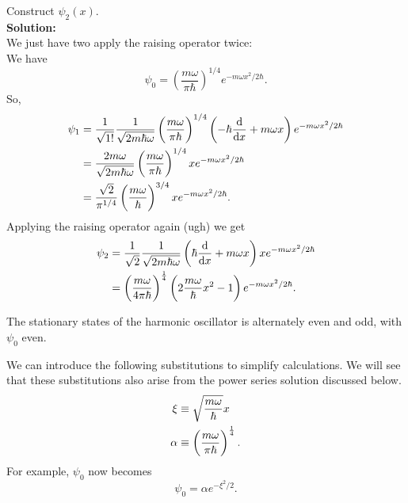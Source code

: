 \begin{wex}
Construct $\psi_2(x)$.\\
\textbf{Solution: }\\
We just have two apply the raising operator twice: \\
We have 
\begin{equation}
\psi_0=\left(\frac{m\omega}{\pi\hbar} \right)^{1/4}e^{-m\omega x^2/2\hbar}.
\end{equation}
So,
\begin{subequations}
\begin{align}
\psi_1&=\frac{1}{\sqrt{1!}}\frac{1}{\sqrt{2m\hbar\omega}}\left(\frac{m\omega}{\pi\hbar} \right)^{1/4}\lf(-\hbar\diff{}{x}+m\omega x\rt)e^{-m\omega x^2/2\hbar}\\
&=\frac{2m\omega}{\sqrt{2m\hbar\omega}}\left(\frac{m\omega}{\pi\hbar} \right)^{1/4}xe^{-m\omega x^2/2\hbar}\\
&=\frac{\sqrt{2}}{\pi^{1/4}}\left(\frac{m\omega}{\hbar} \right)^{3/4}xe^{-m\omega x^2/2\hbar}.
\end{align}
\end{subequations}
Applying the raising operator again (ugh) we get 
\begin{subequations}
\begin{align}
\psi_2&=\frac{1}{\sqrt{2}}\frac{1}{\sqrt{2m\hbar\omega}}\lf(\hbar\diff{}{x}+m\omega x\rt)xe^{-m\omega x^2/2\hbar}\\
&=\lf(\frac{m\omega}{4\pi\hbar} \rt)^{\frac{1}{4}}\lf(2\frac{m\omega}{\hbar}x^2-1 \rt)e^{-m\omega x^2/2\hbar}.
\end{align}
\end{subequations}
\end{wex}
\begin{prt}[Symmetry]
The stationary states of the harmonic oscillator is alternately even and odd, with $\psi_0$ even.
\end{prt}
\begin{prt}[Substitutions]
We can introduce the following substitutions to simplify calculations. We will see that these substitutions also arise from the power series solution discussed below. 
\begin{subequations}
\begin{align}
\xi&\equiv\sqrt{\frac{m\omega}{\hbar}}x\\
\alpha&\equiv\left(\frac{m\omega}{\pi\hbar} \right)^{\frac{1}{4}}.
\end{align}
\end{subequations}
For example, $\psi_0$ now becomes 
\begin{equation}
\psi_0=\alpha e^{-\xi^2/2}.
\end{equation}
\end{prt}
